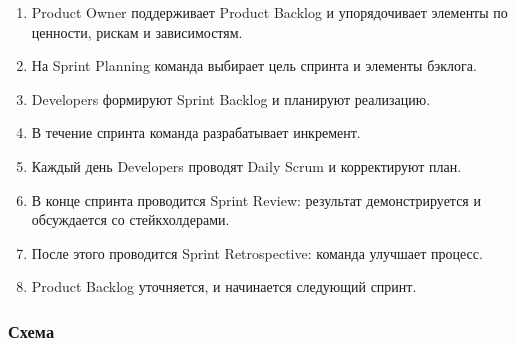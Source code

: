 \documentclass[12pt,a4paper]{article}
\begin{document}
\begin{enumerate}
    \item Product Owner поддерживает Product Backlog и упорядочивает элементы по ценности, рискам и зависимостям.
    \item На Sprint Planning команда выбирает цель спринта и элементы бэклога.
    \item Developers формируют Sprint Backlog и планируют реализацию.
    \item В течение спринта команда разрабатывает инкремент.
    \item Каждый день Developers проводят Daily Scrum и корректируют план.
    \item В конце спринта проводится Sprint Review: результат демонстрируется и обсуждается со стейкхолдерами.
    \item После этого проводится Sprint Retrospective: команда улучшает процесс.
    \item Product Backlog уточняется, и начинается следующий спринт.
\end{enumerate}

\subsubsection*{Схема}

\begin{center}
\end{center}
\end{document}
